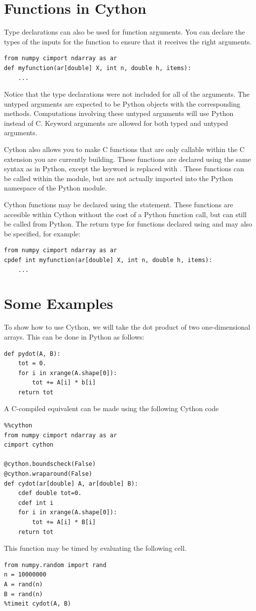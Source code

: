\section*{Functions in Cython}
Type declarations can also be used for function arguments.
You can declare the types of the inputs for the function to ensure that it receives the right arguments.
\begin{lstlisting}
from numpy cimport ndarray as ar
def myfunction(ar[double] X, int n, double h, items):
    ...
\end{lstlisting}
Notice that the type declarations were not included for all of the arguments.
The untyped arguments are expected to be Python objects with the corresponding methods.
Computations involving these untyped arguments will use Python instead of C.
Keyword arguments are allowed for both typed and untyped arguments.

Cython also allows you to make C functions that are only callable within the C extension you are currently building.
These functions are declared using the same syntax as in Python, except the keyword  is replaced with .
These functions can be called within the module, but are not actually imported into the Python namespace of the Python module.

Cython functions may be declared using the  statement.
These functions are accesible within Cython without the cost of a Python function call, but can still be called from Python.
The return type for functions declared using  and  may also be specified, for example:
\begin{lstlisting}
from numpy cimport ndarray as ar
cpdef int myfunction(ar[double] X, int n, double h, items):
    ...
\end{lstlisting}

\section*{Some Examples}
To show how to use Cython, we will take the dot product of two one-dimensional arrays.
This can be done in Python as follows:
\begin{lstlisting}
def pydot(A, B):
    tot = 0.
    for i in xrange(A.shape[0]):
        tot += A[i] * b[i]
    return tot
\end{lstlisting}
A C-compiled equivalent can be made using the following Cython code
\begin{lstlisting}
%%cython
from numpy cimport ndarray as ar
cimport cython

@cython.boundscheck(False)
@cython.wraparound(False)
def cydot(ar[double] A, ar[double] B):
    cdef double tot=0.
    cdef int i
    for i in xrange(A.shape[0]):
        tot += A[i] * B[i]
    return tot
\end{lstlisting}
This function may be timed by evaluating the following cell.
\begin{lstlisting}
from numpy.random import rand
n = 10000000
A = rand(n)
B = rand(n)
%timeit cydot(A, B)
\end{lstlisting}

